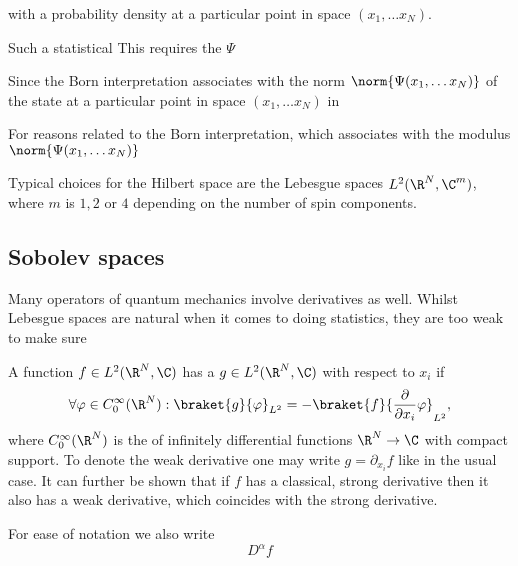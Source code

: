 		
		with a probability density at a particular
		point in space $(x_1, \ldots x_N)$.
		

		Such a statistical 
		This requires the $\Psi$

		Since the Born interpretation associates with the
		norm $\norm{\Psi(x_1, \ldots x_N)}$ of the state at a particular
		point in space $(x_1, \ldots x_N)$ in 

		For reasons related to the Born interpretation,
		which associates with the modulus $\norm{\Psi(x_1, \ldots x_N)}$

		Typical choices for the Hilbert space are the Lebesgue spaces
		$L^2(\R^N, \C^m)$,
		where $m$ is $1, 2$ or $4$ depending on the number of spin components.


\subsection{Sobolev spaces}
Many operators of quantum mechanics involve derivatives as well.
Whilst Lebesgue spaces are natural when it comes to doing statistics,
they are too weak to make sure 


\begin{defn}
	A function $f \in L^2(\R^N, \C)$ has a 
	$g \in L^2(\R^N, \C)$ with respect to $x_i$ if
	\[ \forall \varphi \in C^\infty_0(\R^N): \braket{g}{\varphi}_{L^2} = - \braket{f}{\frac{\partial}{\partial x_i}\varphi}_{L^2}, \]
	where $C^\infty_0(\R^N)$ is the of infinitely differential
	functions $\R^N \to \C$ with compact support.
	To denote the weak derivative
	one may write $g = \partial_{x_i} f$ like in the usual case.
	It can further be shown that if $f$ has a classical, strong derivative
	then it also has a weak derivative, which coincides with the strong derivative.
	
	For ease of notation we also write 
	\[ D^\alpha f \]
\end{defn}

